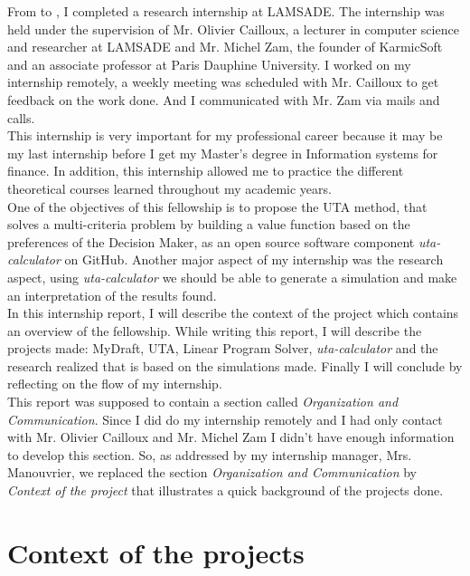 \documentclass{report}
\begin{document}
From  to , I completed a research internship at LAMSADE. The internship was held under the supervision of Mr. Olivier Cailloux, a lecturer in computer science and researcher at LAMSADE and Mr. Michel Zam, the founder of KarmicSoft and an associate professor at Paris Dauphine University. I worked on my internship remotely, a weekly meeting was scheduled with Mr. Cailloux to get feedback on the work done. And I communicated with Mr. Zam via mails and calls. \\

This internship is very important for my professional career because it may be my last internship before I get my Master’s degree in Information systems for finance.  In addition, this internship allowed me to practice the different theoretical courses learned throughout my academic years.\\

One of the objectives of this fellowship is to propose the UTA method, that solves a multi-criteria problem by building a value function based on the preferences of the Decision Maker, as an open source software component \textit{uta-calculator} on GitHub. Another major aspect of my internship was the research aspect, using \textit{uta-calculator} we should be able to generate a simulation and make an interpretation of the results found.\\

In this internship report, I will describe the context of the project which contains an overview of the fellowship. While writing this report, I will describe the projects made: MyDraft, UTA, Linear Program Solver, \textit{uta-calculator} and the research realized that is based on the simulations made. Finally I will conclude by reflecting on the flow of my internship. \\

This report was supposed to contain a section called \textit{Organization and Communication}. Since I did do my internship remotely and I had only contact with Mr. Olivier Cailloux and Mr. Michel Zam I didn’t have enough information to develop this section. So, as addressed by my internship manager, Mrs. Manouvrier, we replaced the section \textit{Organization and Communication} by \textit{Context of the project} that illustrates a quick background of the projects done. \\

\chapter{Context of the projects}
\end{document}
